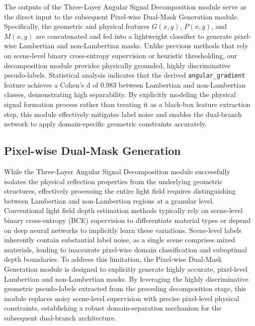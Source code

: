 \documentclass[lettersize,journal]{IEEEtran}
\begin{document}
The outputs of the Three-Layer Angular Signal Decomposition module serve as the direct input to the subsequent Pixel-wise Dual-Mask Generation module. Specifically, the geometric and physical features $G(x,y)$, $P(x,y)$, and $M(x,y)$ are concatenated and fed into a lightweight classifier to generate pixel-wise Lambertian and non-Lambertian masks. Unlike previous methods that rely on scene-level binary cross-entropy supervision or heuristic thresholding, our decomposition module provides physically grounded, highly discriminative pseudo-labels. Statistical analysis indicates that the derived \texttt{angular\_gradient} feature achieves a Cohen's d of 0.983 between Lambertian and non-Lambertian classes, demonstrating high separability. By explicitly modeling the physical signal formation process rather than treating it as a black-box feature extraction step, this module effectively mitigates label noise and enables the dual-branch network to apply domain-specific geometric constraints accurately.

\subsection{Pixel-wise Dual-Mask Generation}

While the Three-Layer Angular Signal Decomposition module successfully isolates the physical reflection properties from the underlying geometric structures, effectively processing the entire light field requires distinguishing between Lambertian and non-Lambertian regions at a granular level. Conventional light field depth estimation methods typically rely on scene-level binary cross-entropy (BCE) supervision to differentiate material types or depend on deep neural networks to implicitly learn these variations. Scene-level labels inherently contain substantial label noise, as a single scene comprises mixed materials, leading to inaccurate pixel-wise domain classification and suboptimal depth boundaries. To address this limitation, the Pixel-wise Dual-Mask Generation module is designed to explicitly generate highly accurate, pixel-level Lambertian and non-Lambertian masks. By leveraging the highly discriminative geometric pseudo-labels extracted from the preceding decomposition stage, this module replaces noisy scene-level supervision with precise pixel-level physical constraints, establishing a robust domain-separation mechanism for the subsequent dual-branch architecture.
\end{document}
